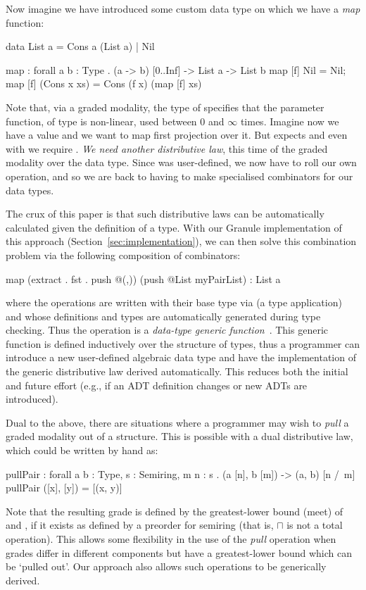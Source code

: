 Now imagine we have introduced some custom data type 
on which we have a \emph{map} function:
%
\begin{granule}
data List a = Cons a (List a) | Nil

map : forall {a b : Type} . (a -> b) [0..Inf] -> List a -> List b
map [f] Nil = Nil;
map [f] (Cons x xs) = Cons (f x) (map [f] xs)
\end{granule}
%
Note that, via a graded modality, the type of  specifies that the parameter
function, of type  is non-linear, used between
$0$ and $\infty$ times. Imagine now we have a value
 and we want to map first
projection over it. But  expects 
and even with  we require .
\emph{We need another distributive law}, this time of the graded modality
over the  data type. Since  was
user-defined, we now have to roll our own  operation, and so we
are back to having to make specialised combinators for our
data types.

The crux of this paper is that such distributive laws can be
automatically calculated given the definition of a type. With
our Granule implementation of this approach (Section~\ref{sec:implementation}),
we can then solve this combination problem via the following
composition of combinators:
%
\begin{granule}
map (extract . fst . push @(,)) (push @List myPairList) : List a
\end{granule}
%
where the  operations are written with their base type
via  (a type application) and whose definitions and types
are automatically generated during type checking. Thus the
 operation is a \textit{data-type generic
  function}~\cite{hinze2000new}. This generic function is defined
inductively over the structure of types, thus a programmer can introduce a new
user-defined algebraic data type and have the implementation of the generic
distributive law derived automatically.
This reduces both the
initial and future effort (e.g., if an ADT definition changes or new ADTs are
introduced).

Dual to the above, there are situations where a programmer
may wish to \emph{pull} a graded modality out of a structure. This is
possible with a dual distributive law, which could be written
by hand as:
%
\begin{granule}
pullPair : forall {a b : Type, s : Semiring, m n : s} 
         . (a [n], b [m]) -> (a, b) [n /\ m]
pullPair ([x], [y]) = [(x, y)]
\end{granule}
%
Note that the resulting grade is defined by the greatest-lower bound
(meet) of  and , if it exists as defined
by a preorder for semiring 
 (that is, $\sqcap$ is not a total operation). This
allows some flexibility in the use of the \emph{pull} operation when
grades differ in different components but have a
greatest-lower bound which can be `pulled out'.
Our approach also allows such operations to be generically derived.

